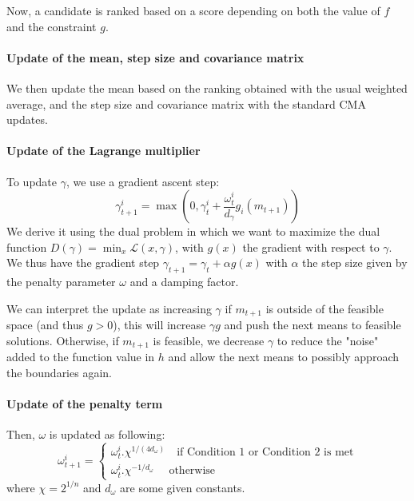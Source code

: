 \documentclass[11pt,a4paper]{article}
\numberwithin{equation}{section}
\numberwithin{figure}{section}
\numberwithin{table}{section}
\theoremstyle{definition}
\begin{document}
Now, a candidate is ranked based on a score depending on both the value of $f$ and the constraint $g$.

\paragraph{Update of the mean, step size and covariance matrix} 
We then update the mean based on the ranking obtained with the usual weighted average, and the step size and covariance matrix with the standard CMA updates.


\paragraph{Update of the Lagrange multiplier} To update $\gamma$, we use a gradient ascent step:
\begin{equation}
\label{eq:al-cmaes-gamma}
\gamma^i_{t+1} = \max (0, \gamma_t^i + \frac{\omega_t^i}{d_\gamma} g_i (m_{t+1}))
\end{equation}
We derive it using the dual problem in which we want to maximize the dual function $D(\gamma) = \min_x \mathcal{L}(x, \gamma)$, with $g(x)$ the gradient with respect to $\gamma$. We thus have the gradient step $\gamma_{t+1} = \gamma_{t} + \alpha g(x)$ with $\alpha$ the step size given by the penalty parameter $\omega$ and a damping factor. 

We can interpret the update as increasing $\gamma$ if $m_{t+1}$ is outside of the feasible space (and thus $g> 0$), this will increase $\gamma g$ and push the next means to feasible solutions. Otherwise, if $m_{t+1}$ is feasible, we decrease $\gamma$ to reduce the "noise" added to the function value in $h$ and allow the next means to possibly approach the boundaries again.

\paragraph{Update of the penalty term} Then, $\omega$ is updated as following:
\begin{equation}
\label{eq:al-cmaes-omega}
\omega^i_{t+1} = 
\begin{cases}
    \omega_t^i . \chi^{1/(4d_\omega)} \quad \text{if Condition 1 or Condition 2 is met}\\
    \omega_t^i . \chi^{-1/d_\omega} \quad \text{ otherwise}
\end{cases}
\end{equation}
where $\chi = 2^{1/n}$ and $d_\omega$ are some given constants.
\end{document}
